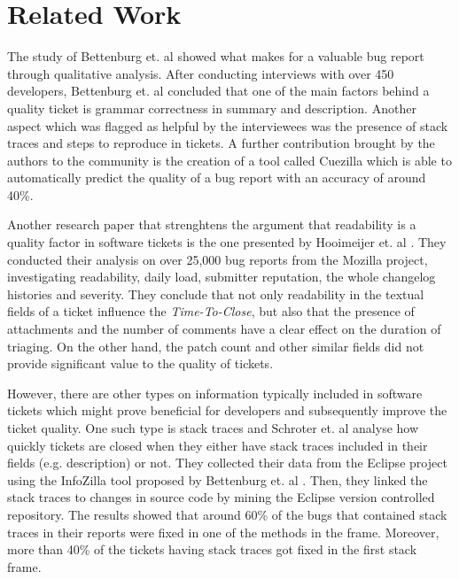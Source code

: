\documentclass{mpaper}
\begin{document}
\section{Related Work}\label{related_work}

The study of Bettenburg et. al \cite{bettenburg2008makes} showed what 
makes for a valuable bug report through qualitative analysis. 
After conducting interviews with over 450 developers, Bettenburg et. al concluded that one of the main factors
behind a quality ticket is grammar correctness in summary and description. Another
aspect which was flagged as helpful by the interviewees was the presence of stack 
traces and steps to reproduce in tickets. A further contribution brought by the
authors to the community is the creation of a tool called Cuezilla which is able 
to automatically predict the quality of a bug report with an accuracy of around 40\%.

Another research paper that strenghtens the argument that readability is a quality 
factor in software tickets is the one presented by Hooimeijer et. al \cite{hooimeijer2007modeling}.
They conducted their analysis on over 25,000 bug reports from the Mozilla project, 
investigating readability, daily load, submitter reputation, the whole changelog histories 
and severity. They conclude that not only readability in the textual fields of a ticket
influence the \emph{Time-To-Close}, but also that the presence of attachments and 
the number of comments have a clear effect on the duration of triaging. On the 
other hand, the patch count and other similar fields did not provide significant 
value to the quality of tickets.

However, there are other types on information typically included in software tickets 
which might prove beneficial for developers and subsequently improve the ticket quality.
One such type is stack traces and Schroter et. al \cite{schroter2010stack} analyse how 
quickly tickets are closed when they either have stack traces included in their fields 
(e.g. description) or not. They collected their data from the Eclipse project using 
the InfoZilla tool proposed by Bettenburg et. al \cite{bettenburg2008extracting}.
Then, they linked the stack traces to changes in source code by mining the Eclipse version 
controlled repository. The results showed that 
around 60\% of the bugs that contained stack traces in their reports were fixed
in one of the methods in the frame. Moreover, more than 40\% of the tickets having stack traces
got fixed in the first stack frame.
\end{document}
